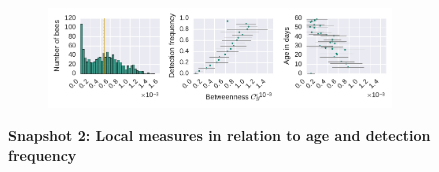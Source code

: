 \begin{figure}[!h]
\begin{subfigure}[b]{1.0\textwidth}
	\end{subfigure}
	\begin{subfigure}[b]{1.0\textwidth}
	\centering
	\includegraphics[width=1.0\textwidth]{Figures/n2-stat-betweenAgeDetF.pdf}
	\end{subfigure}
	\caption[Snapshot 2: Local measures in relation to age and detection frequency]{\textbf{Snapshot 2: Local measures in relation to age and detection frequency}}
	\label{fig:n2-degreeStrLCC}
\end{figure}